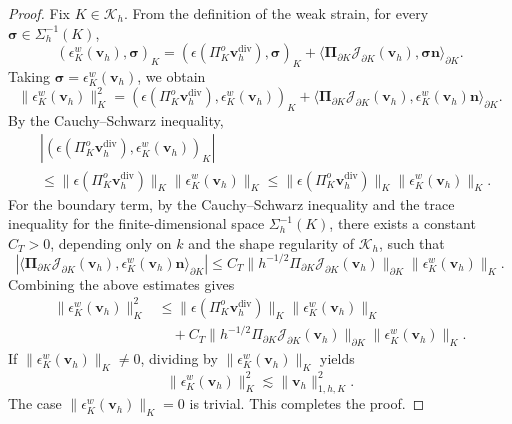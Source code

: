 \documentclass[review,hidelinks,onefignum,onetabnum]{siamart251216}
\begin{document}
\begin{proof}
Fix \(K\in\mathcal{K}_h\). From the definition of the weak strain, for every
\(\boldsymbol{\sigma}\in\Sigma_h^{-1}(K)\),
\[
(\epsilon_K^w(\boldsymbol{v}_h),\boldsymbol{\sigma})_K
=
(\epsilon(\Pi_K^o\boldsymbol{v}_h^{\operatorname{div}}),\boldsymbol{\sigma})_K
+
\langle
\boldsymbol{\Pi}_{\partial K}\mathcal{J}_{\partial K}(\boldsymbol{v}_h),
\boldsymbol{\sigma}\boldsymbol{n}
\rangle_{\partial K}.
\]
Taking \(\boldsymbol{\sigma}=\epsilon_K^w(\boldsymbol{v}_h)\), we obtain
\[
\|\epsilon_K^w(\boldsymbol{v}_h)\|_K^2
=
(\epsilon(\Pi_K^o\boldsymbol{v}_h^{\operatorname{div}}),\epsilon_K^w(\boldsymbol{v}_h))_K
+
\langle
\boldsymbol{\Pi}_{\partial K}\mathcal{J}_{\partial K}(\boldsymbol{v}_h),
\epsilon_K^w(\boldsymbol{v}_h)\boldsymbol{n}
\rangle_{\partial K}.
\]
By the Cauchy--Schwarz inequality,
\[
\begin{aligned}
&
\left|
(\epsilon(\Pi_K^o\boldsymbol{v}_h^{\operatorname{div}}),
\epsilon_K^w(\boldsymbol{v}_h))_K
\right| \\
&\le
\|\epsilon(\Pi_K^o\boldsymbol{v}_h^{\operatorname{div}})\|_K
\|\epsilon_K^w(\boldsymbol{v}_h)\|_K
\le
\|\epsilon(\Pi_K^o\boldsymbol{v}_h^{\operatorname{div}})\|_K
\|\epsilon_K^w(\boldsymbol{v}_h)\|_K.
\end{aligned}
\]
For the boundary term, by the Cauchy--Schwarz inequality and the trace inequality for the finite-dimensional space \(\Sigma_h^{-1}(K)\), there exists a constant \(C_T>0\), depending only on \(k\) and the shape regularity of \(\mathcal{K}_h\), such that
\[
\left|
\langle
\boldsymbol{\Pi}_{\partial K}\mathcal{J}_{\partial K}(\boldsymbol{v}_h),
\epsilon_K^w(\boldsymbol{v}_h)\boldsymbol{n}
\rangle_{\partial K}
\right|
\le
C_T
\|h^{-1/2}\Pi_{\partial K}\mathcal{J}_{\partial K}(\boldsymbol{v}_h)\|_{\partial K}
\|\epsilon_K^w(\boldsymbol{v}_h)\|_K.
\]
Combining the above estimates gives
\[
\begin{aligned}
\|\epsilon_K^w(\boldsymbol{v}_h)\|_K^2
&\le
\|\epsilon(\Pi_K^o\boldsymbol{v}_h^{\operatorname{div}})\|_K
\|\epsilon_K^w(\boldsymbol{v}_h)\|_K \\
&\quad
+
C_T
\|h^{-1/2}\Pi_{\partial K}\mathcal{J}_{\partial K}(\boldsymbol{v}_h)\|_{\partial K}
\|\epsilon_K^w(\boldsymbol{v}_h)\|_K.
\end{aligned}
\]
If \(\|\epsilon_K^w(\boldsymbol{v}_h)\|_K\neq 0\), dividing by \(\|\epsilon_K^w(\boldsymbol{v}_h)\|_K\) yields
\[
\|\epsilon_K^w(\boldsymbol{v}_h)\|_K^2
\lesssim
\|\boldsymbol{v}_h\|_{1,h,K}^2.
\]
The case \(\|\epsilon_K^w(\boldsymbol{v}_h)\|_K=0\) is trivial. 
This completes the proof.
\end{proof}
\end{document}
